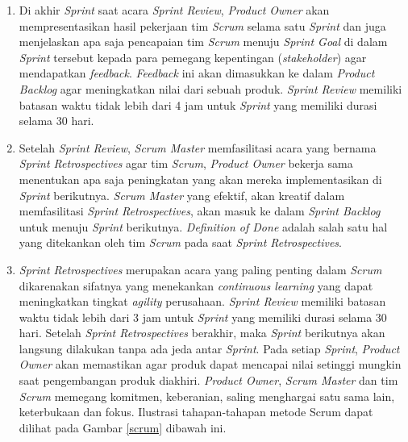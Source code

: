 \begin {enumerate}[1.]
\item Di akhir \textit{Sprint} saat acara \textit{Sprint Review}, \textit{Product Owner} akan mempresentasikan hasil pekerjaan tim \textit{Scrum} selama satu \textit{Sprint} dan juga menjelaskan apa saja pencapaian tim \textit{Scrum} menuju \textit{Sprint Goal} di dalam \textit{Sprint} tersebut kepada para pemegang kepentingan (\textit{stakeholder}) agar mendapatkan \textit{feedback}. \textit{Feedback} ini akan dimasukkan ke dalam \textit{Product Backlog} agar meningkatkan nilai dari sebuah produk. \textit{Sprint Review} memiliki batasan waktu tidak lebih dari 4 jam untuk \textit{Sprint} yang memiliki durasi selama 30 hari.
\item Setelah \textit{Sprint Review}, \textit{Scrum Master} memfasilitasi acara yang bernama \textit{Sprint Retrospectives} agar tim \textit{Scrum}, \textit{Product Owner} bekerja sama menentukan apa saja peningkatan yang akan mereka implementasikan di \textit{Sprint} berikutnya. \textit{Scrum Master} yang efektif, akan kreatif dalam memfasilitasi \textit{Sprint Retrospectives}, akan masuk ke dalam \textit{Sprint Backlog} untuk menuju \textit{Sprint} berikutnya. \textit{Definition of Done} adalah salah satu hal yang ditekankan oleh tim \textit{Scrum} pada saat \textit{Sprint Retrospectives}.
\item \textit{Sprint Retrospectives} merupakan acara yang paling penting dalam \textit{Scrum} dikarenakan sifatnya yang menekankan \textit{continuous learning} yang dapat meningkatkan tingkat \textit{agility} perusahaan. \textit{Sprint Review} memiliki batasan waktu tidak lebih dari 3 jam untuk \textit{Sprint} yang memiliki durasi selama 30 hari. Setelah \textit{Sprint Retrospectives} berakhir, maka \textit{Sprint} berikutnya akan langsung dilakukan tanpa ada jeda antar \textit{Sprint}. Pada setiap \textit{Sprint}, \textit{Product Owner} akan memastikan agar produk dapat mencapai nilai setinggi mungkin saat pengembangan produk diakhiri. \textit{Product Owner}, \textit{Scrum Master} dan tim \textit{Scrum} memegang komitmen, keberanian, saling menghargai satu sama lain, keterbukaan dan fokus. Ilustrasi tahapan-tahapan metode Scrum dapat dilihat pada Gambar \ref{scrum} dibawah ini.
\end{enumerate}

